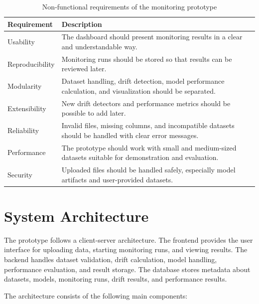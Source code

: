 \begin{table}[h]
\centering
\begin{tabular}{p{} p{}}
\hline
\textbf{Requirement} & \textbf{Description} \\
\hline
Usability & The dashboard should present monitoring results in a clear and understandable way. \\
Reproducibility & Monitoring runs should be stored so that results can be reviewed later. \\
Modularity & Dataset handling, drift detection, model performance calculation, and visualization should be separated. \\
Extensibility & New drift detectors and performance metrics should be possible to add later. \\
Reliability & Invalid files, missing columns, and incompatible datasets should be handled with clear error messages. \\
Performance & The prototype should work with small and medium-sized datasets suitable for demonstration and evaluation. \\
Security & Uploaded files should be handled safely, especially model artifacts and user-provided datasets. \\
\hline
\end{tabular}
\caption{Non-functional requirements of the monitoring prototype}
\label{tab:non-functional-requirements}
\end{table}

\section{System Architecture}

The prototype follows a client-server architecture. The frontend provides the user interface for uploading data, starting monitoring runs, and viewing results. The backend handles dataset validation, drift calculation, model handling, performance evaluation, and result storage. The database stores metadata about datasets, models, monitoring runs, drift results, and performance results.

The architecture consists of the following main components:


